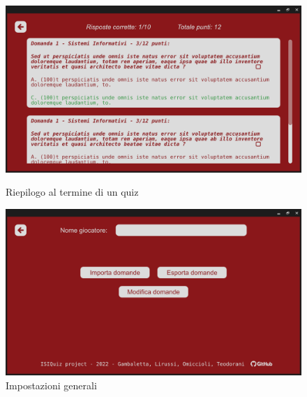         \begin{figure}[H]
          \centering
          \begin{minipage}[b]{0.48\textwidth}
             \includegraphics[width=\textwidth]{Images/mockup/review.png}
            \caption{Riepilogo al termine di un quiz}
            \label{fig:review}
          \end{minipage}
          \hfill
          \begin{minipage}[b]{0.48\textwidth}
            \includegraphics[width=\textwidth]{Images/mockup/settings3.png}
            \caption{Impostazioni generali}
            \label{fig:settings3}
          \end{minipage}
        \end{figure}

